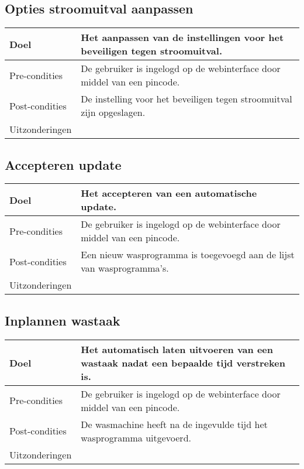 \subsection{Opties stroomuitval aanpassen}
\begin{center}
  \begin{tabular}{ | p{4cm} | p{8.5cm} | }    \hline
    Doel & Het aanpassen van de instellingen voor het beveiligen tegen stroomuitval. \\ \hline
    Pre-condities & De gebruiker is ingelogd op de webinterface door middel van een pincode. \\ \hline
    Post-condities & De instelling voor het beveiligen tegen stroomuitval zijn opgeslagen. \\ \hline
    Uitzonderingen &  \\
    \hline
  \end{tabular}
\end{center}

\subsection{Accepteren update}
\begin{center}
  \begin{tabular}{ | p{4cm} | p{8.5cm} | } %
    \hline
    Doel & Het accepteren van een automatische update. \\ \hline
    Pre-condities & De gebruiker is ingelogd op de webinterface door middel van een pincode. \\ \hline
    Post-condities & Een nieuw wasprogramma is toegevoegd aan de lijst van wasprogramma's. \\ \hline
    Uitzonderingen &  \\
    \hline
  \end{tabular}
\end{center}

\subsection{Inplannen wastaak}
\begin{center}
  \begin{tabular}{ | p{4cm} | p{8.5cm} | } %
    \hline
    Doel & Het automatisch laten uitvoeren van een wastaak nadat een bepaalde tijd verstreken is. \\ \hline
    Pre-condities & De gebruiker is ingelogd op de webinterface door middel van een pincode. \\ \hline
    Post-condities & De wasmachine heeft na de ingevulde tijd het wasprogramma uitgevoerd. \\ \hline
    Uitzonderingen &  \\
    \hline
  \end{tabular}
\end{center}

